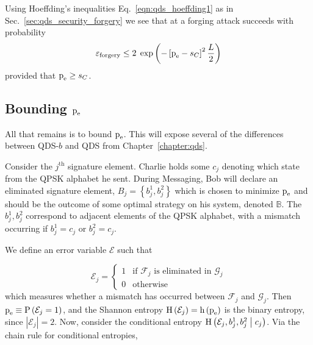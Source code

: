 Using Hoeffding's inequalities Eq.~\ref{eqn:qds_hoeffding1} as in Sec.~\ref{sec:qds_security_forgery} we see that at a forging attack succeeds with probability 
\begin{equation}\label{eqn:aqc_forgery}
\varepsilon_{\text{forgery}} \le 2 \; \exp\left( - \left[ \text{p}_{\text{e}} - s_C\right]^2 \frac{L}{2} \right)
\end{equation}
provided that $\text{p}_{\text{e}} \ge s_C$. 

\subsection{Bounding $\text{p}_{\text{e}}$}
All that remains is to bound $\text{p}_{\text{e}}$. This will expose several of the differences between QDS-$b$ and QDS from Chapter~\ref{chapter:qds}.


Consider the $j^\text{th}$ signature element. Charlie holds some $c_j$ denoting which state from the QPSK alphabet he sent. During Messaging, Bob will declare an eliminated signature element, $B_j = \left\{b_j^1, b_j^2\right\}$ which is chosen to minimize $\text{p}_{\text{e}}$ and should be the outcome of some optimal strategy on his system, denoted $\mathbb{B}$. The $b_j^1, b_j^2$ correspond to adjacent elements of the QPSK alphabet, with a mismatch occurring if $b_j^1 = c_j$ or $b_j^2 = c_j$. %

We define an error variable $\mathcal{E}$ such that 

\begin{equation*}\label{eqn:aqc_error}
\mathcal{E}_j = 
\begin{cases}
1 & \text{if $\mathcal{F}_j$ is eliminated in $\mathcal{G}_j$} \\
0 & \text{otherwise}
\end{cases}
\end{equation*}
which measures whether a mismatch has occurred between $\mathcal{F}_j$ and $\mathcal{G}_j$. Then $\text{p}_{\text{e}} \equiv \text{P}\left(\mathcal{E}_j = 1\right)$, and the Shannon entropy $\text{H}\left(\mathcal{E}_j\right) = \text{h}\left(\text{p}_{\text{e}}\right)$ is the binary entropy, since $\left|\mathcal{E}_j\right| = 2$. Now, consider the conditional entropy $\text{H}\left(\mathcal{E}_j, b_j^1, b_j^2 \; \middle| \; c_j\right)$. Via the chain rule for conditional entropies,

